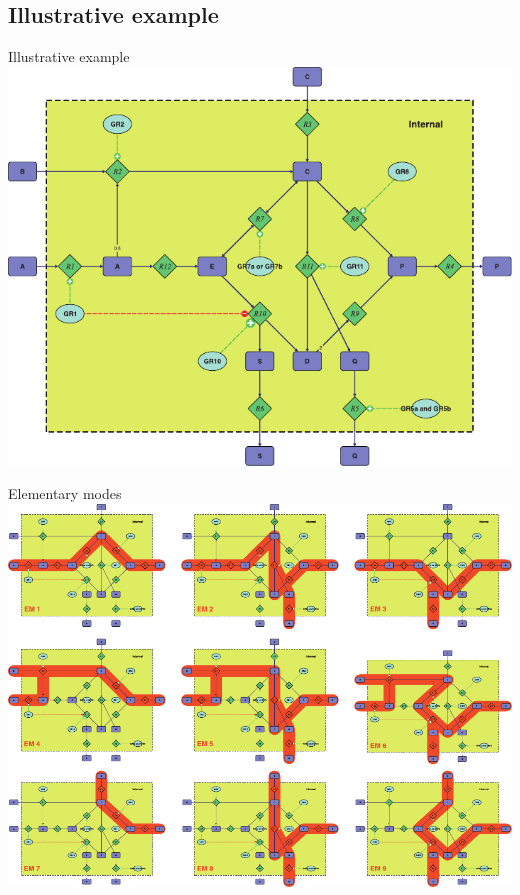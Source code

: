 \documentclass{beamer}
\begin{document}
\subsection{Illustrative example}

\begin{frame}{Illustrative example}
    \includegraphics[width=.9\textwidth]{grafik/fig1} \\
\end{frame}

\begin{frame}{Elementary modes}
    \includegraphics[width=.9\textwidth]{grafik/fig2} \\
\end{frame}
\end{document}
